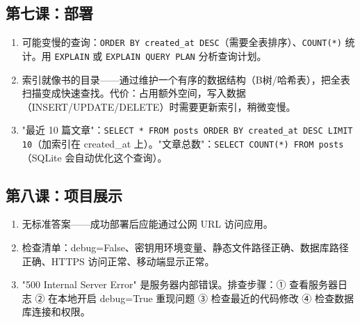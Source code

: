 \documentclass[a4paper,12pt]{ctexart}
\begin{document}
\subsection*{第七课：部署}
\begin{enumerate}
  \item 可能变慢的查询：\texttt{ORDER BY created\_at DESC}（需要全表排序）、\texttt{COUNT(*)} 统计。用 \texttt{EXPLAIN} 或 \texttt{EXPLAIN QUERY PLAN} 分析查询计划。
  \item 索引就像书的目录——通过维护一个有序的数据结构（B树/哈希表），把全表扫描变成快速查找。代价：占用额外空间，写入数据（INSERT/UPDATE/DELETE）时需要更新索引，稍微变慢。
  \item "最近 10 篇文章"：\texttt{SELECT * FROM posts ORDER BY created\_at DESC LIMIT 10}（加索引在 created\_at 上）。"文章总数"：\texttt{SELECT COUNT(*) FROM posts}（SQLite 会自动优化这个查询）。
\end{enumerate}

\subsection*{第八课：项目展示}
\begin{enumerate}
  \item 无标准答案——成功部署后应能通过公网 URL 访问应用。
  \item 检查清单：debug=False、密钥用环境变量、静态文件路径正确、数据库路径正确、HTTPS 访问正常、移动端显示正常。
  \item "500 Internal Server Error" 是服务器内部错误。排查步骤：① 查看服务器日志 ② 在本地开启 debug=True 重现问题 ③ 检查最近的代码修改 ④ 检查数据库连接和权限。
\end{enumerate}
\end{document}
